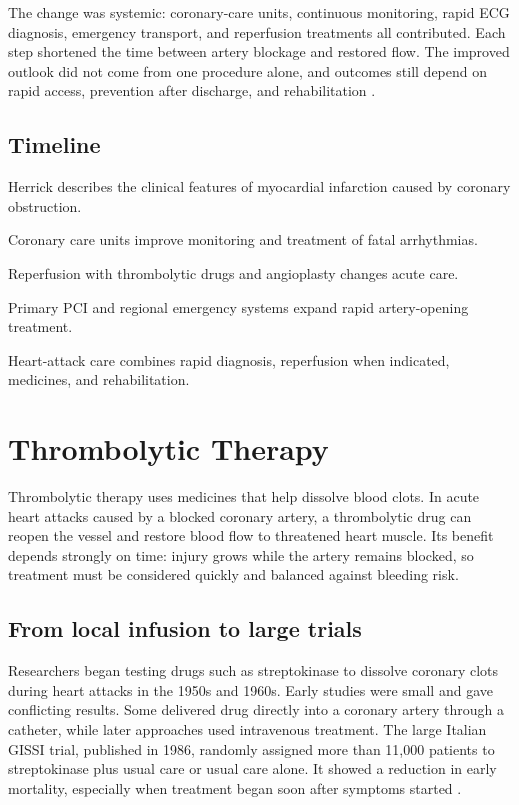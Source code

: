 \documentclass[12pt,oneside]{book}
\begin{document}
The change was systemic: coronary-care units, continuous monitoring, rapid ECG
diagnosis, emergency transport, and reperfusion treatments all contributed.
Each step shortened the time between artery blockage and restored flow. The
improved outlook did not come from one procedure alone, and outcomes still
depend on rapid access, prevention after discharge, and rehabilitation
\cite{miTreatmentHistory,ahaHeartAttackTreatment}.

\section*{Timeline}
\begin{description}[leftmargin=2.3cm,style=nextline]
  \item[1912] Herrick describes the clinical features of myocardial infarction caused by coronary obstruction.
  \item[1960s] Coronary care units improve monitoring and treatment of fatal arrhythmias.
  \item[1970s--1980s] Reperfusion with thrombolytic drugs and angioplasty changes acute care.
  \item[1990s onward] Primary PCI and regional emergency systems expand rapid artery-opening treatment.
  \item[Today] Heart-attack care combines rapid diagnosis, reperfusion when indicated, medicines, and rehabilitation.
\end{description}
\chapter[Thrombolytic Therapy]{Thrombolytic Therapy}

Thrombolytic therapy uses medicines that help dissolve blood clots. In
acute heart attacks caused by a blocked coronary artery, a thrombolytic
drug can reopen the vessel and restore blood flow to threatened heart
muscle. Its benefit depends strongly on time: injury grows while the
artery remains blocked, so treatment must be considered quickly and
balanced against bleeding risk.

\section{From local infusion to large trials}
Researchers began testing drugs such as streptokinase to dissolve
coronary clots during heart attacks in the 1950s and 1960s. Early studies
were small and gave conflicting results. Some delivered drug directly
into a coronary artery through a catheter, while later approaches used
intravenous treatment. The large Italian GISSI trial, published in 1986,
randomly assigned more than 11,000 patients to streptokinase plus usual
care or usual care alone. It showed a reduction in early mortality,
especially when treatment began soon after symptoms started
\cite{gissiTrial,streptokinaseHistory}.
\end{document}
